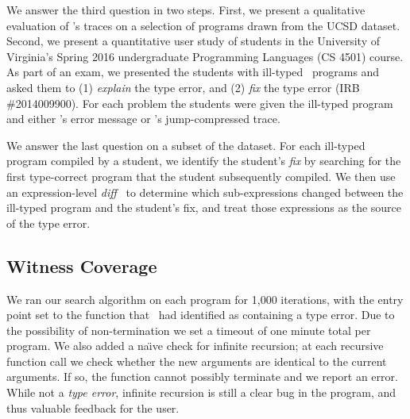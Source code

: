 We answer the third question in two steps.
%
First, we present a qualitative evaluation of \toolname's traces on a
selection of programs drawn from the UCSD dataset.
%
Second, we present a quantitative user study of students in the
University of Virginia's Spring 2016 undergraduate Programming Languages
(CS 4501) course.
%
As part of an exam, we presented the students with ill-typed \ocaml\
programs and asked them to
%
(1) \emph{explain} the type error, and
%
(2) \emph{fix} the type error (IRB \#2014009900).
%
For each problem the students were given the ill-typed program and
either \ocaml's error message or \toolname's jump-compressed trace.

We answer the last question on a subset of the \ucsdbench dataset.
%
For each ill-typed program compiled by a student, we identify the student's
\emph{fix} by searching for the first type-correct program that the student
subsequently compiled.
%
We then use an expression-level \emph{diff}~\cite{Lempsink2009-xf} to
determine which sub-expressions changed between the ill-typed program
and the student's fix, and treat those expressions as the source of the
type error.

\subsection{Witness Coverage}
\label{sec:eval:witness-coverage}
%
We ran our search algorithm on each program for 1,000 iterations, with
the entry point set to the function that \ocaml\ had identified as
containing a type error.
%
Due to the possibility of non-termination we set a timeout of one minute
total per program.
%
%
We also added a na{\"\i}ve check for infinite recursion; at each recursive
function call we check whether the new arguments are identical to the
current arguments.
%
If so, the function cannot possibly terminate and we report an error.
%
While not a \emph{type error}, infinite recursion is still a clear bug
in the program, and thus valuable feedback for the user.

